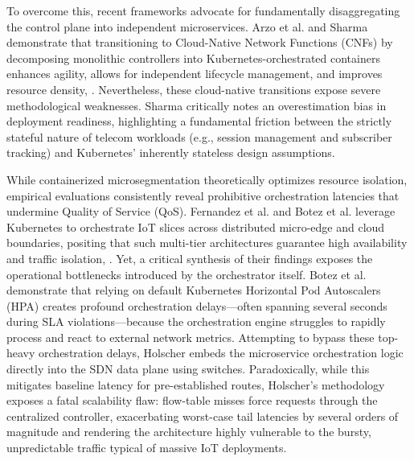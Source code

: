 \documentclass[conference]{IEEEtran}
\begin{document}
To overcome this, recent frameworks advocate for fundamentally disaggregating the control plane into independent microservices. Arzo et al. and Sharma demonstrate that transitioning to Cloud-Native Network Functions (CNFs) by decomposing monolithic controllers into Kubernetes-orchestrated containers enhances agility, allows for independent lifecycle management, and improves resource density\cite{b8}, \cite{b10}. Nevertheless, these cloud-native transitions expose severe methodological weaknesses. Sharma critically notes an overestimation bias in deployment readiness, highlighting a fundamental friction between the strictly stateful nature of telecom workloads (e.g., session management and subscriber tracking) and Kubernetes' inherently stateless design assumptions\cite{b10}.

While containerized microsegmentation theoretically optimizes resource isolation, empirical evaluations consistently reveal prohibitive orchestration latencies that undermine Quality of Service (QoS). Fernandez et al. and Botez et al. leverage Kubernetes to orchestrate IoT slices across distributed micro-edge and cloud boundaries, positing that such multi-tier architectures guarantee high availability and traffic isolation\cite{b20}, \cite{b21}. Yet, a critical synthesis of their findings exposes the operational bottlenecks introduced by the orchestrator itself. Botez et al. demonstrate that relying on default Kubernetes Horizontal Pod Autoscalers (HPA) creates profound orchestration delays---often spanning several seconds during SLA violations---because the orchestration engine struggles to rapidly process and react to external network metrics\cite{b20}. Attempting to bypass these top-heavy orchestration delays, Holscher embeds the microservice orchestration logic directly into the SDN data plane using switches\cite{b30}. Paradoxically, while this mitigates baseline latency for pre-established routes, Holscher's methodology exposes a fatal scalability flaw: flow-table misses force requests through the centralized controller, exacerbating worst-case tail latencies by several orders of magnitude and rendering the architecture highly vulnerable to the bursty, unpredictable traffic typical of massive IoT deployments\cite{b30}.
\end{document}
